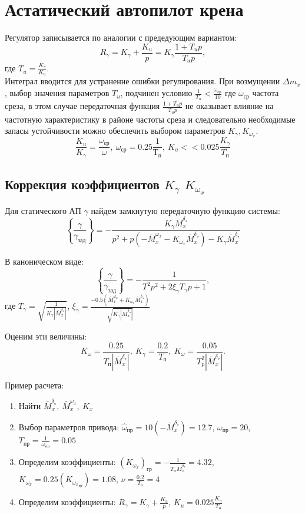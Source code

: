 \documentclass{article}
\begin{document}
\section{Астатический автопилот крена}
Регулятор записывается по аналогии с предедующим вариантом:
\[
R_\gamma = K_\gamma +\frac{K_u}{p}  = K_\gamma\frac{1 + T_u p}{T_u p},
\]
где $T_u  = \frac{K_\gamma}{K_u}$.\\
Интеграл вводится для устранение ошибки регулирования. При возмущении $\Delta m_x$, выбор значения параметров $T_u$, подчинен условию $\frac{1}{T_u} < \frac{\omega_{ср}}{10}$ где $\omega_{ср}$ частота среза, в этом случае передаточная функция $\frac{1 + T_u p}{T_u p}$ не оказывает влияние на частотную характеристику в районе частоты среза и следовательно необходимые запасы устойчивости можно обеспечить выбором параметров $K_\gamma, K_{\omega_x}$.
\[
\frac{K_u}{K_\gamma} =\frac{\omega_{ср}}{\omega}, \ \omega_{ср} = 0.25\frac{1}{Т_п}, \ K_u << 0.025\frac{K_\gamma}{T_п}
\]
\subsection{Коррекция коэффициентов $K_\gamma$ $K_{\omega_x}$}
Для статического АП $\gamma$ найдем замкнутую передаточную функцию системы:
\[
\left\{\frac{\gamma}{\gamma_{зад}}\right\} = -\frac{K_\gamma \bar{M}_x^{\delta_э}}{p^2 + p(-\bar{M}_x^{\omega_x} - K_{\omega_x} \bar{M}_x^{\delta_э}) - K_{\gamma} \bar{M}_x^{\delta_э}} 
\]

В каноническом виде:
\[
\left\{\frac{\gamma}{\gamma_{зад}}\right\} = -\frac{1}{T^2 p^2 + 2\xi_{\gamma} T_{\gamma} p + 1},
\]
где $T_\gamma = \sqrt{\frac{1}{K_\gamma |\bar{M}_x^{\delta_э}|}}$, $\xi_{\gamma} = \frac{-0.5(\bar{M}_x^{\omega_x} + K_{\omega_x} \bar{M}_x^{\delta_э})}{\sqrt{K_\gamma |\bar{M}_x^{\delta_э}|}}$

Оценим эти величины:
\[
K_\omega =\frac{0.25}{T_{п}|\bar{M}_x^{\delta_э}|},\ K_\gamma = \frac{0.2}{T_{п}},\ K_\omega =\frac{0.05}{T_p^2 |\bar{M}_x^{\delta_э}|}.
\]

Пример расчета:
\begin{enumerate}
\item Найти $\bar{M}_x ^{\delta_э},\ \bar{M}_x^{\omega_x},\ K_x$
\item Выбор параметров привода:
$\hat{\omega}_{пр} = 10(-\bar{M}_x^{\delta_э}) =  12.7$, $\omega_{пр} = 20$, $T_{пр} = \frac{1}{\omega_{пр}} = 0.05$
\item Определим коэффициенты:
$(K_{\omega_x})_{гр} = -\frac{1}{T_п \bar{M}_x^{\delta_э}}=4.32$, $K_{\omega_x} = 0.25 (K_{{\omega_x}_{гр}}) = 1.08$, $\nu =\frac{0.2}{T_п}=4$
\item Определим коэффициенты: $R_\gamma = K_\gamma +\frac{K_u}{p}$, $K_u = 0.025 \frac{K_\gamma}{T_п}$
\end{enumerate}
\end{document}
